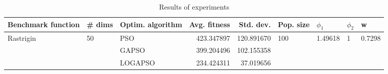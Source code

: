 \begin{table}
\centering
\caption{Results of experiments}
\begin{tabular}{lllrrllll}
\toprule
        Benchmark function &             \# dims & Optim. algorithm &  Avg. fitness &  Std. dev. &            Pop. size &               $\phi_{1}$ &         $\phi_{2}$ &                       w \\
\midrule
\multirow{3}{*}{Rastrigin} & \multirow{3}{*}{50} &              PSO &    423.347897 & 120.891670 & \multirow{3}{*}{100} & \multirow{3}{*}{1.49618} & \multirow{3}{*}{1} & \multirow{3}{*}{0.7298} \\
                           &                     &            GAPSO &    399.204496 & 102.155358 &                      &                          &                    &                         \\
                           &                     &          LOGAPSO &    234.424311 &  37.019656 &                      &                          &                    &                         \\
\bottomrule
\end{tabular}
\end{table}
